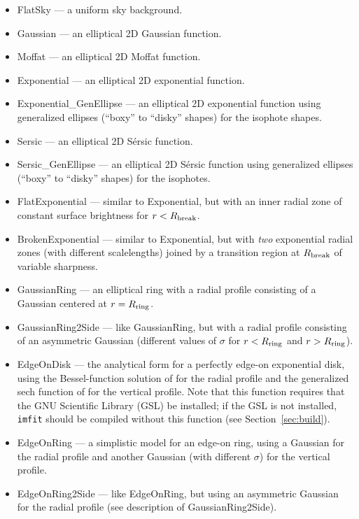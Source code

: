 \documentclass[10pt]{article}
\newcommand{\imfit}{\texttt{imfit}}
\begin{document}
\begin{itemize}
\item FlatSky --- a uniform sky background.
\item Gaussian --- an elliptical 2D Gaussian function.
\item Moffat --- an elliptical 2D Moffat function.
\item Exponential --- an elliptical 2D exponential function.
\item Exponential\_GenEllipse --- an elliptical 2D exponential function using
generalized ellipses (``boxy'' to ``disky'' shapes) for the isophote shapes.
\item Sersic --- an elliptical 2D S\'ersic function.
\item Sersic\_GenEllipse --- an elliptical 2D S\'ersic function using
generalized ellipses (``boxy'' to ``disky'' shapes) for the isophotes.
\item FlatExponential --- similar to Exponential, but with an inner radial zone
of constant surface brightness for $r < R_{\rm break}$.
\item BrokenExponential --- similar to Exponential, but with \textit{two}
exponential radial zones (with different scalelengths) joined by a transition region
at $R_{\rm break}$ of variable sharpness.
\item GaussianRing --- an elliptical ring with a radial profile
consisting of a Gaussian centered at $r = R_{\rm ring}$.
\item GaussianRing2Side --- like GaussianRing, but with a radial profile
consisting of an asymmetric Gaussian (different values of $\sigma$ for
$r < R_{\rm ring}$ and $r > R_{\rm ring}$).
\item EdgeOnDisk --- the analytical form for a perfectly edge-on exponential
disk, using the Bessel-function solution of \citet{vdk81} for 
the radial profile and the generalized sech function of \citet{vdk88} 
for the vertical profile. Note that this function requires that the GNU
Scientific Library (GSL) be installed; if the GSL is not installed, \imfit{}
should be compiled without this function (see Section~\ref{sec:build}).
\item EdgeOnRing --- a simplistic model for an edge-on ring, using a
Gaussian for the radial profile and another Gaussian (with
different $\sigma$) for the vertical profile.
\item EdgeOnRing2Side --- like EdgeOnRing, but using an
asymmetric Gaussian for the radial profile (see description of GaussianRing2Side).


\end{itemize}
\end{document}
